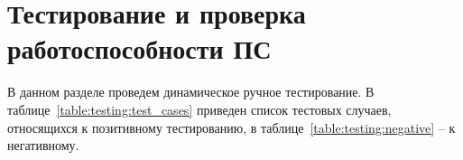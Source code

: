 \section{Тестирование и проверка работоспособности ПС}
\label{sec:testing}

В данном разделе проведем динамическое ручное тестирование. В таблице~\ref{table:testing:test_cases} приведен список тестовых случаев, относящихся к позитивному тестированию, в таблице~\ref{table:testing:negative} -- к негативному.

\newcommand\testnumber{\stepcounter{testnumber}\arabic{testnumber}}

\renewcommand{\labelenumi}{\arabic{enumi})}
\renewcommand{\labelenumii}{\asbuk{enumii})}

